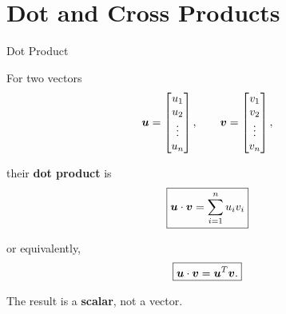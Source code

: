 

\section{Dot and Cross Products}


\begin{frame}{Dot Product}

For two vectors
\vspace{-0.1cm}
\[
\bm{u}=
\begin{bmatrix}
u_1\\
u_2\\
\vdots\\
u_n
\end{bmatrix},
\qquad
\bm{v}=
\begin{bmatrix}
v_1\\
v_2\\
\vdots\\
v_n
\end{bmatrix},
\]

their \textbf{dot product} is
\vspace{-0.1cm}
\[
\boxed{
\bm{u}\cdot\bm{v}
=
\sum_{i=1}^{n}u_iv_i
}
\]

or equivalently,
\vspace{-0.1cm}
\[
\boxed{
\bm{u}\cdot\bm{v}
=
\bm{u}^{T}\bm{v}.
}
\]

The result is a \textbf{scalar}, not a vector.

\end{frame}



